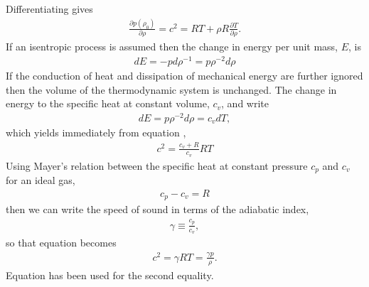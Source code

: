 


Differentiating  gives
\begin{align}
  \label{eqn:linear:differential}
    \frac{\partial p(\rho_0)}{\partial \rho} = c^2 = RT + \rho R \frac{\partial T}{\partial \rho}.
\end{align}
If an isentropic process is assumed then the change in energy per unit mass, $E$, is 
\begin{align}
  dE = -pd\rho^{-1} = p \rho^{-2} d\rho
\end{align}
If the conduction of heat and dissipation of mechanical energy are further ignored 
then the volume of the thermodynamic system is unchanged.
The change in energy to the specific heat at constant volume, $c_v$,  and write
\begin{align}
  dE = p \rho^{-2} d\rho = c_v dT,
\end{align}
which yields immediately from equation ,
\begin{align}
  \label{eqn:linear:diffential:two}
  c^2 = \frac{c_v + R}{c_v}RT
\end{align}
Using Mayer's relation between the specific heat at constant pressure $c_p$ and $c_v$ for an ideal gas,
\begin{align}
  \label{eqn:Mayer}
  c_p - c_v = R
\end{align}
then we can write the speed of sound in terms of the adiabatic index,
\begin{align}
\gamma \equiv  \frac{c_p}{c_v},
\end{align}
so that equation  becomes
\begin{align}
  \label{eqn:eqnState}
  c^2 = \gamma RT = \frac{\gamma p}{\rho}.
\end{align}
Equation  has been used for the second equality.


